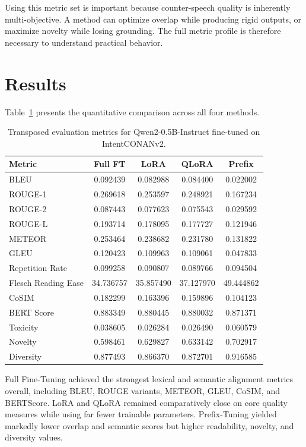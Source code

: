 \documentclass[11pt]{article}
\begin{document}
Using this metric set is important because counter-speech quality is inherently multi-objective. A method can optimize overlap while producing rigid outputs, or maximize novelty while losing grounding. The full metric profile is therefore necessary to understand practical behavior.

\section{Results}
Table~\ref{tab:results} presents the quantitative comparison across all four methods.

\begin{table}[h!]
\centering
\caption{Transposed evaluation metrics for Qwen2-0.5B-Instruct fine-tuned on IntentCONANv2.}
\label{tab:results}
\small
\setlength{\tabcolsep}{6pt}
\begin{tabular}{lcccc}
\toprule
\textbf{Metric} & \textbf{Full FT} & \textbf{LoRA} & \textbf{QLoRA} & \textbf{Prefix} \\
\midrule
BLEU & 0.092439 & 0.082988 & 0.084400 & 0.022002 \\
ROUGE-1 & 0.269618 & 0.253597 & 0.248921 & 0.167234 \\
ROUGE-2 & 0.087443 & 0.077623 & 0.075543 & 0.029592 \\
ROUGE-L & 0.193714 & 0.178095 & 0.177727 & 0.121946 \\
METEOR & 0.253464 & 0.238682 & 0.231780 & 0.131822 \\
GLEU & 0.120423 & 0.109963 & 0.109061 & 0.047833 \\
Repetition Rate & 0.099258 & 0.090807 & 0.089766 & 0.094504 \\
Flesch Reading Ease & 34.736757 & 35.857490 & 37.127970 & 49.444862 \\
CoSIM & 0.182299 & 0.163396 & 0.159896 & 0.104123 \\
BERT Score & 0.883349 & 0.880445 & 0.880032 & 0.871371 \\
Toxicity & 0.038605 & 0.026284 & 0.026490 & 0.060579 \\
Novelty & 0.598461 & 0.629827 & 0.633142 & 0.702917 \\
Diversity & 0.877493 & 0.866370 & 0.872701 & 0.916585 \\
\bottomrule
\end{tabular}
\end{table}

Full Fine-Tuning achieved the strongest lexical and semantic alignment metrics overall, including BLEU, ROUGE variants, METEOR, GLEU, CoSIM, and BERTScore. LoRA and QLoRA remained comparatively close on core quality measures while using far fewer trainable parameters. Prefix-Tuning yielded markedly lower overlap and semantic scores but higher readability, novelty, and diversity values.
\end{document}
